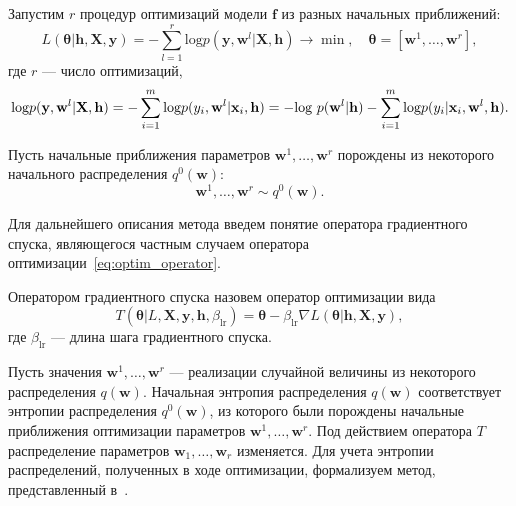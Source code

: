 Запустим $r$ процедур оптимизаций модели $\mathbf{f}$ из разных начальных приближений:
\[
	L( \boldsymbol{\theta}| \mathbf{h}, \mathbf{X}, \mathbf{y}) = -\sum_{l=1}^r \text{log}p(\mathbf{y}, \mathbf{w}^l|\mathbf{X}, \mathbf{h})  \to \min, \quad \boldsymbol{\theta} = [\mathbf{w}^1, \dots, \mathbf{w}^r],
\] 
где $r$ --- число оптимизаций,
\begin{equation}
\label{eq:loss_func}
\text{log}p(\mathbf{y}, \mathbf{w}^l|\mathbf{X}, \mathbf{h}) = -\sum_{i=1}^m \textnormal{log}p({y}_i, \mathbf{w}^l |\mathbf{x}_i, \mathbf{h}) = -\textnormal{log}~p(\mathbf{w}^l|\mathbf{h}) - \sum_{i=1}^m \textnormal{log}p({y}_i |\mathbf{x}_i, \mathbf{w}^l, \mathbf{h}).
\end{equation}

Пусть начальные приближения параметров $\mathbf{w}^1, \dots, \mathbf{w}^r$ порождены из некоторого начального распределения $q^0(\mathbf{w})$:
\[ 
	\mathbf{w}^1, \dots, \mathbf{w}^r \sim q^0(\mathbf{w}). 
\]




Для дальнейшего описания метода введем понятие оператора градиентного спуска, являющегося частным случаем оператора оптимизации~\eqref{eq:optim_operator}.
\begin{defin}
Оператором градиентного спуска назовем оператор оптимизации вида
\begin{equation}
\label{eq:sgd}
	T( \boldsymbol{\theta}| L,\mathbf{X},  \mathbf{y},  \mathbf{h}, {\beta_{\text{lr}}}) = \boldsymbol{\theta} - \beta_{\text{lr}} \nabla L( \boldsymbol{\theta}| \mathbf{h}, \mathbf{X}, \mathbf{y}), 
\end{equation}
где  $\beta_{\text{lr}}$ --- длина шага градиентного спуска.
\end{defin}

Пусть значения $\mathbf{w}^1, \dots, \mathbf{w}^r$  --- реализации случайной величины из некоторого распределения $q(\mathbf{w})$. Начальная энтропия распределения $q(\mathbf{w})$ соответствует энтропии распределения $q^0(\mathbf{w})$, из которого были порождены начальные приближения оптимизации параметров $\mathbf{w}^1, \dots, \mathbf{w}^r$. Под действием оператора $T$ распределение параметров $\mathbf{w}_1, \dots, \mathbf{w}_r$ изменяется. Для учета энтропии распределений, полученных в ходе оптимизации,
{ формализуем метод,  представленный в~\cite{early}. }

